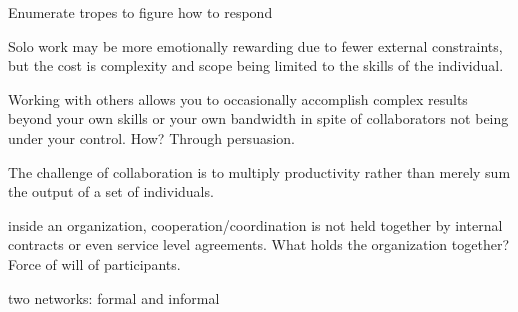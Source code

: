 Enumerate tropes to figure how to respond

Solo work may be more emotionally rewarding due to fewer external constraints, but the cost is complexity and scope being limited to the skills of the individual. 

Working with others allows you to occasionally accomplish complex results beyond your own skills or your own bandwidth in spite of collaborators not being under your control. How? Through persuasion. 

The challenge of collaboration is to multiply productivity rather than merely sum the output of a set of individuals. 

inside an organization, cooperation/coordination is not held together by internal contracts or even service level agreements. What holds the organization together? Force of will of participants. 

two networks: formal and informal